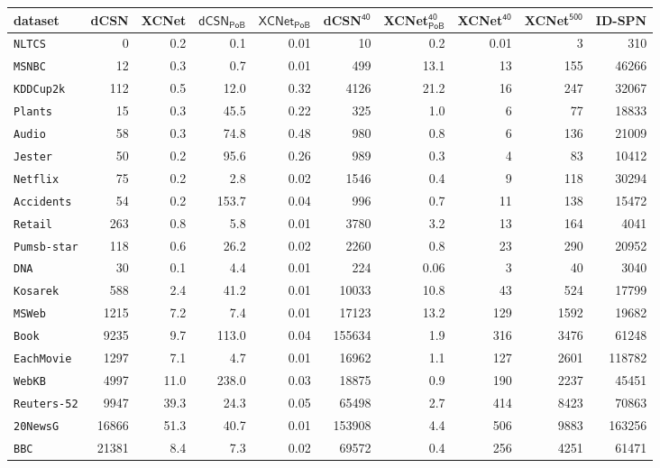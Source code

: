 \documentclass[final]{beamer}
\begin{document}
\begin{frame}{}
\begin{textblock}{17.5}
\begin{minipage}{1.0\linewidth}
  \begin{table}[t]
    \centering \setlength{\tabcolsep}{1pt} \tiny
    \begin{tabular}{l rrr r r r r r r}
      dataset           & \textsf{dCSN} & \textsf{XCNet} & $\mathsf{dCSN_{PoB}}$ &
                                                                                   $\mathsf{XCNet_{PoB}}$ &\textsf{dCSN$^{\mathsf{40}}$} & \textsf{XCNet$^{\mathsf{40}}_\mathsf{PoB}$}& \textsf{XCNet$^{\mathsf{40}}$} & \textsf{XCNet$^{\mathsf{500}}$} & \textsf{ID-SPN}\\
      \midrule
      \texttt{NLTCS}& 0&0.2&0.1	&0.01&10&0.2& 0.01 & 3 &310\\ 
      \texttt{MSNBC} & 12&0.3&0.7&	0.01&499&13.1& 13 & 155 &46266\\ 
      \texttt{KDDCup2k}&112&0.5&12.0&0.32&4126&21.2& 16& 247 &32067\\ 
      \texttt{Plants}&15&0.3&45.5	&0.22&325&1.0& 6 & 77 &18833\\ 
      \texttt{Audio} & 58&0.3&74.8&0.48&980&0.8&6 &136 &21009\\ 
      \texttt{Jester}&50&0.2&95.6&	0.26&989&0.3&4 & 83 &10412\\ 
      \texttt{Netflix}&75&0.2&2.8&	0.02&1546&0.4& 9& 118&30294\\ 
      \texttt{Accidents}&54&0.2&153.7	&0.04&996&0.7& 11& 138 &15472\\ 
      \texttt{Retail}&263&0.8&5.8	&0.01&3780&3.2& 13 & 164&4041\\ 
      \texttt{Pumsb-star}&118&0.6&26.2&	0.02&2260&0.8& 23 & 290 &20952\\ 
      \texttt{DNA}&30&0.1&4.4&	0.01&224&0.06& 3& 40 &3040\\ 
      \texttt{Kosarek}&588&2.4&41.2&	0.01&10033&10.8& 43 &524 &17799\\ 
      \texttt{MSWeb}&1215&7.2&7.4	&0.01&17123&13.2& 129 & 1592 &19682\\ 
      \texttt{Book}&9235&9.7&113.0	&0.04&155634&1.9& 316& 3476&61248\\ 
      \texttt{EachMovie}&1297&7.1&4.7	&0.01&16962&1.1& 127 & 2601&118782\\ 
      \texttt{WebKB}&4997&11.0&238.0&	0.03&18875&0.9& 190 & 2237 &45451\\ 
      \texttt{Reuters-52}&9947&39.3&24.3&	0.05&65498&2.7& 414 & 8423 &70863\\ 
      \texttt{20NewsG}&16866&51.3&40.7&	0.01&153908&4.4& 506& 9883&163256\\ 
      \texttt{BBC}&21381&8.4&7.3&	0.02&69572&0.4& 256& 4251 &61471\\ 

\end{tabular}
\end{table}
\end{minipage}
\end{textblock}
\end{frame}
\end{document}
